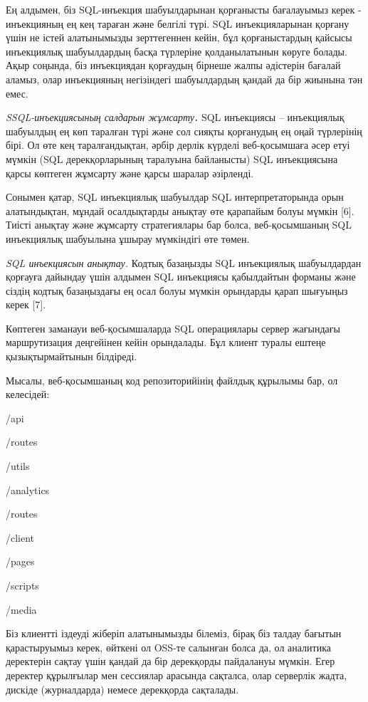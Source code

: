 Ең алдымен, біз SQL-инъекция шабуылдарынан қорғанысты бағалауымыз керек
- инъекцияның ең кең тараған және белгілі түрі. SQL инъекцияларынан
қорғану үшін не істей алатынымызды зерттегеннен кейін, бұл
қорғаныстардың қайсысы инъекциялық шабуылдардың басқа түрлеріне
қолданылатынын көруге болады. Ақыр соңында, біз инъекциядан қорғаудың
бірнеше жалпы әдістерін бағалай аламыз, олар инъекцияның негізіндегі
шабуылдардың қандай да бір жиынына тән емес.

\emph{SSQL-инъекциясының салдарын жұмсарту{\bfseries . }}SQL инъекциясы --
инъекциялық шабуылдың ең көп таралған түрі және сол сияқты қорғанудың ең
оңай түрлерінің бірі. Ол өте кең таралғандықтан, әрбір дерлік күрделі
веб-қосымшаға әсер етуі мүмкін (SQL дерекқорларының таралуына
байланысты) SQL инъекциясына қарсы көптеген жұмсарту және қарсы шаралар
әзірленді.

Сонымен қатар, SQL инъекциялық шабуылдар SQL интерпретаторында орын
алатындықтан, мұндай осалдықтарды анықтау өте қарапайым болуы мүмкін
{[}6{]}. Тиісті анықтау және жұмсарту стратегиялары бар болса,
веб-қосымшаның SQL инъекциялық шабуылына ұшырау мүмкіндігі өте төмен.

\emph{SQL инъекциясын анықтау.} Кодтық базаңызды SQL инъекциялық
шабуылдардан қорғауға дайындау үшін алдымен SQL инъекциясы қабылдайтын
форманы және сіздің кодтық базаңыздағы ең осал болуы мүмкін орындарды
қарап шығуыңыз керек {[}7{]}.

Көптеген заманауи веб-қосымшаларда SQL операциялары сервер жағындағы
маршрутизация деңгейінен кейін орындалады. Бұл клиент туралы ештеңе
қызықтырмайтынын білдіреді.

Мысалы, веб-қосымшаның код репозиторийінің файлдық құрылымы бар, ол
келесідей:

/api

/routes

/utils

/analytics

/routes

/client

/pages

/scripts

/media

Біз клиентті іздеуді жіберіп алатынымызды білеміз, бірақ біз талдау
бағытын қарастыруымыз керек, өйткені ол OSS-те салынған болса да, ол
аналитика деректерін сақтау үшін қандай да бір дерекқорды пайдалануы
мүмкін. Егер деректер құрылғылар мен сессиялар арасында сақталса, олар
серверлік жадта, дискіде (журналдарда) немесе дерекқорда сақталады.

